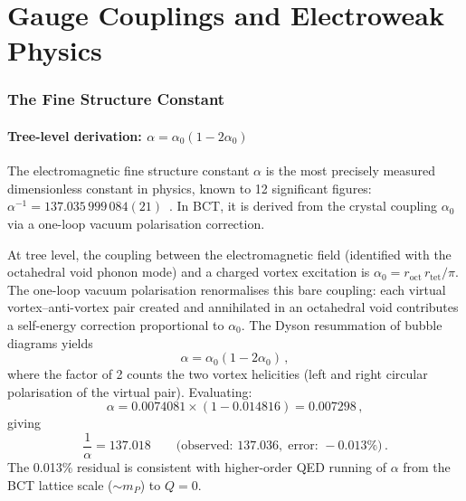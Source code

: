 \documentclass[review,number,sort&compress]{elsarticle}
\newcommand{\roct}{r_{\mathrm{oct}}}
\newcommand{\rtet}{r_{\mathrm{tet}}}
\newcommand{\azero}{\alpha_0}
\begin{document}

\part{Gauge Couplings and Electroweak Physics}
\label{part:gauge}

\section{The Fine Structure Constant}
\label{sec:alpha}

\subsection{Tree-level derivation: $\alpha = \azero(1 - 2\azero)$}

The electromagnetic fine structure constant $\alpha$ is the most precisely
measured dimensionless constant in physics, known to 12 significant
figures: $\alpha^{-1} = 137.035\,999\,084(21)$~\cite{PDG2024}. In BCT,
it is derived from the crystal coupling $\azero$ via a one-loop
vacuum polarisation correction.

At tree level, the coupling between the electromagnetic field (identified
with the octahedral void phonon mode) and a charged vortex excitation
is $\azero = \roct\,\rtet/\pi$. The one-loop vacuum polarisation
renormalises this bare coupling: each virtual vortex--anti-vortex pair
created and annihilated in an octahedral void contributes a self-energy
correction proportional to $\azero$. The Dyson resummation of bubble
diagrams yields
\begin{equation}
  \alpha = \azero(1 - 2\azero)\,,
  \label{eq:alpha}
\end{equation}
where the factor of 2 counts the two vortex helicities (left and right
circular polarisation of the virtual pair). Evaluating:
\begin{equation}
  \alpha = 0.0074081 \times (1 - 0.014816) = 0.007298\,,
  \label{eq:alpha_num}
\end{equation}
giving
\begin{equation}
  \frac{1}{\alpha} = 137.018 \qquad
  \bigl(\text{observed: } 137.036,\;\text{error: } -0.013\%\bigr)\,.
  \label{eq:inv_alpha}
\end{equation}
The 0.013\% residual is consistent with higher-order QED running of
$\alpha$ from the BCT lattice scale ($\sim m_P$) to $Q = 0$.
\end{document}
